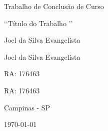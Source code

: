 \begin{titlepage}
\begin{center}
\vfill





{\fontsize{28}{\baselineskip}\selectfont
Trabalho de Conclusão de Curso 
}

\vfill





{\fontsize{36}{\baselineskip}\selectfont
‘‘Título do Trabalho ’’
}

\vfill





\begin{minipage}{0.7\linewidth}
	{\onehalfspacing\fontsize{20}{\baselineskip}\selectfont
	
    Joel da Silva Evangelista
    
    Joel da Silva Evangelista 
    
    }
\end{minipage}
\begin{minipage}{0.25\linewidth}
	{\onehalfspacing\fontsize{18}{\baselineskip}\selectfont
	RA: 176463
	
	RA: 176463
	
	}
\end{minipage}

\vspace{10mm}







{\fontsize{20}{\baselineskip}\selectfont
{}}

\vfill





{\fontsize{14}{\baselineskip}\selectfont
	Campinas - SP

	\today
}

\end{center}
\end{titlepage}